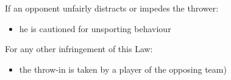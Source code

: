 {{\bigskip

If an opponent unfairly distracts or impedes the thrower:

\begin{itemize}
\item he is cautioned for unsporting behaviour
\end{itemize}

\bigskip

For any other infringement of this Law:

\begin{itemize}
\item the throw-in is taken by a player of the opposing team)
\end{itemize}
}
}
